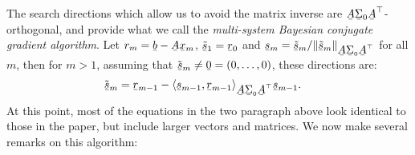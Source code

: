 \documentclass[twoside]{article}
\newcommand\barbelow[1]{\stackunder[1.2pt]{$#1$}{\rule{.8ex}{.075ex}}}
\begin{document}
 The search directions which allow us to avoid the matrix inverse are $\barbelow{A} \barbelow{\Sigma}_0 \barbelow{A}^\top$-orthogonal, and provide what we call the \emph{multi-system Bayesian conjugate gradient algorithm}. Let $r_m = \barbelow{b} - \barbelow{A} \barbelow{x}_m$, $\barbelow{\tilde{s}}_1 = \barbelow{r}_0$ and $\barbelow{s}_m = \barbelow{\tilde{s}}_m/\|\barbelow{\tilde{s}}_m\|_{\barbelow{A} \barbelow{\Sigma}_0 \barbelow{A}^\top}$ for all $m$, then for $m>1$, assuming that $\tilde{\barbelow{s}}_m \neq \barbelow{0} = (0,\ldots,0)$, these directions are:
\begin{align*}
	\tilde{\barbelow{s}}_m & = \barbelow{r}_{m-1} - \langle \barbelow{s}_{m-1}, \barbelow{r}_{m-1} \rangle_{ \barbelow{A}\barbelow{\Sigma}_0 \barbelow{A}^\top} \barbelow{s}_{m-1}.
\end{align*}
At this point, most of the equations in the two paragraph above look identical to those in the paper, but include larger vectors and matrices. We now make several remarks on this algorithm:
\end{document}
